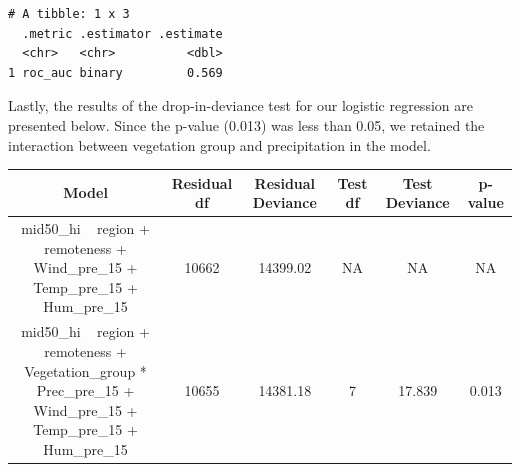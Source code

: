 \documentclass[
  letterpaper,
  DIV=11,
  numbers=noendperiod]{scrartcl}
\begin{document}
\begin{verbatim}
# A tibble: 1 x 3
  .metric .estimator .estimate
  <chr>   <chr>          <dbl>
1 roc_auc binary         0.569
\end{verbatim}

Lastly, the results of the drop-in-deviance test for our logistic
regression are presented below. Since the p-value (0.013) was less than
0.05, we retained the interaction between vegetation group and
precipitation in the model.

\begin{table}
\centering\begingroup\fontsize{7}{9}\selectfont

\begin{tabular}{cccccc}
\toprule
Model & Residual df & Residual Deviance & Test df & Test Deviance & p-value\\
\midrule
\makecell{mid50\_hi ~ region + remoteness + \\ Wind\_pre\_15 + Temp\_pre\_15 + Hum\_pre\_15} & 10662 & 14399.02 & NA & NA & NA\\
\makecell{mid50\_hi ~ region + remoteness + \\ Vegetation\_group * Prec\_pre\_15 + \\ Wind\_pre\_15 + Temp\_pre\_15 + Hum\_pre\_15} & 10655 & 14381.18 & 7 & 17.839 & 0.013\\
\bottomrule
\end{tabular}
\endgroup{}
\end{table}
\end{document}
